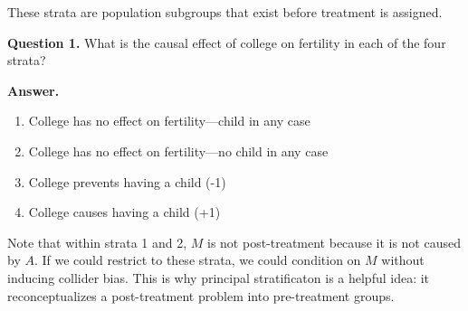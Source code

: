 \documentclass[10pt]{article}
\begin{document}
These strata are population subgroups that exist before treatment is assigned.

\textbf{Question 1.} What is the causal effect of college on fertility in each of the four strata?

\textbf{Answer.}
\begin{enumerate}
\item College has no effect on fertility---child in any case
\item College has no effect on fertility---no child in any case
\item College prevents having a child (-1)
\item College causes having a child (+1)
\end{enumerate} %

Note that within strata 1 and 2, $M$ is not post-treatment because it is not caused by $A$. If we could restrict to these strata, we could condition on $M$ without inducing collider bias. This is why principal stratificaton is a helpful idea: it reconceptualizes a post-treatment problem into pre-treatment groups.
\end{document}
